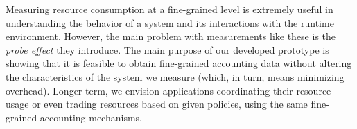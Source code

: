 \documentclass[letterpaper,twocolumn,10pt]{article}
\begin{document}
Measuring resource consumption at a fine-grained level is extremely useful in
understanding the behavior of a system and its interactions with the runtime
environment. However, the main problem with measurements like these is the
\emph{probe effect} they introduce. The main purpose of our developed prototype
is showing that it is feasible to obtain fine-grained accounting data without
altering the characteristics of the system we measure (which, in turn, means
minimizing overhead). Longer term, we envision applications coordinating their
resource usage or even trading resources based on given policies, using the same
fine-grained accounting mechanisms.


{\footnotesize  }
\end{document}
